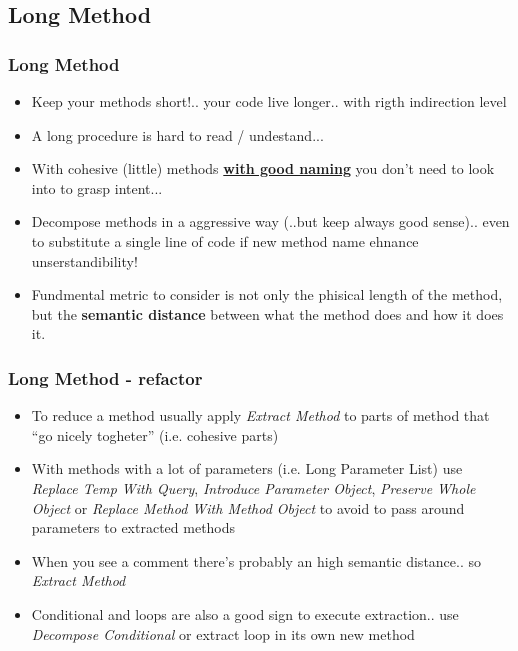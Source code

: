 \documentclass{beamer}
\begin{document}
\subsection{Long Method}
\begin{frame}
  \frametitle{Long Method}
  \begin{itemize}
	\item<+-> Keep your methods short!.. your code live longer.. with rigth indirection level 
	\item<+-> A long procedure is hard to read / undestand...
	\item<+-> With cohesive (little) methods \underline{\textbf{with good naming}} you don't need to look into to grasp intent...
	\item<+-> Decompose methods in a aggressive way (..but keep always good sense).. even to substitute a single line of code if new method name ehnance unserstandibility!
	\item<+-> Fundmental metric to consider is not only the phisical length of the method, but the \textbf{semantic distance} between what the method does and how it does it.
	
  \end{itemize}
\end{frame}


\begin{frame}
  \frametitle{Long Method - refactor}
  \begin{itemize}
	\item<+-> To reduce a method usually apply \textit{Extract Method} to parts of method that ``go nicely togheter'' (i.e. cohesive parts) 
	\item<+-> With methods with a lot of parameters (i.e. Long Parameter List) use \textit{Replace Temp With Query}, \textit{Introduce Parameter Object}, \textit{Preserve Whole Object} or \textit{Replace Method With Method Object} to avoid to pass around parameters to extracted methods
	\item<+-> When you see a comment there's probably an high semantic distance.. so \textit{Extract Method}  
	\item<+-> Conditional and loops are also a good sign to execute extraction.. use \textit{Decompose Conditional} or extract loop in its own new method
  \end{itemize}
\end{frame}
\end{document}
